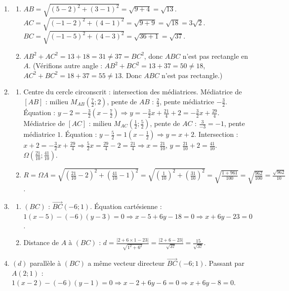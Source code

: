 \begin{enumerate}[label=\arabic*)]
    \item 
    \begin{enumerate}[label=\alph*)]
        \item $AB = \sqrt{(5-2)^2 + (3-1)^2} = \sqrt{9 + 4} = \sqrt{13}$.
        $AC = \sqrt{(-1-2)^2 + (4-1)^2} = \sqrt{9 + 9} = \sqrt{18} = 3\sqrt{2}$.
        $BC = \sqrt{(-1-5)^2 + (4-3)^2} = \sqrt{36 + 1} = \sqrt{37}$.
        \item $AB^2 + AC^2 = 13 + 18 = 31 \neq 37 = BC^2$, donc $ABC$ n'est pas rectangle en $A$. (Vérifions autre angle : $AB^2 + BC^2 = 13 + 37 = 50 \neq 18$, $AC^2 + BC^2 = 18 + 37 = 55 \neq 13$. Donc $ABC$ n'est pas rectangle.)
    \end{enumerate}
    \item 
    \begin{enumerate}[label=\alph*)]
        \item Centre du cercle circonscrit : intersection des médiatrices. Médiatrice de $[AB]$ : milieu $M_{AB}\left(\frac{7}{2}; 2\right)$, pente de $AB$ : $\frac{2}{3}$, pente médiatrice $-\frac{3}{2}$. Équation : $y - 2 = -\frac{3}{2}\left(x - \frac{7}{2}\right) \Rightarrow y = -\frac{3}{2}x + \frac{21}{4} + 2 = -\frac{3}{2}x + \frac{29}{4}$.
        Médiatrice de $[AC]$ : milieu $M_{AC}\left(\frac{1}{2}; \frac{5}{2}\right)$, pente de $AC$ : $\frac{3}{-3} = -1$, pente médiatrice $1$. Équation : $y - \frac{5}{2} = 1\left(x - \frac{1}{2}\right) \Rightarrow y = x + 2$.
        Intersection : $x + 2 = -\frac{3}{2}x + \frac{29}{4} \Rightarrow \frac{5}{2}x = \frac{29}{4} - 2 = \frac{21}{4} \Rightarrow x = \frac{21}{10}$, $y = \frac{21}{10} + 2 = \frac{41}{10}$. $\Omega\left(\frac{21}{10}; \frac{41}{10}\right)$.
        \item $R = \Omega A = \sqrt{\left(\frac{21}{10} - 2\right)^2 + \left(\frac{41}{10} - 1\right)^2} = \sqrt{\left(\frac{1}{10}\right)^2 + \left(\frac{31}{10}\right)^2} = \sqrt{\frac{1 + 961}{100}} = \sqrt{\frac{962}{100}} = \frac{\sqrt{962}}{10}$.
    \end{enumerate}
    \item 
    \begin{enumerate}[label=\alph*)]
        \item $(BC)$ : $\overrightarrow{BC}(-6; 1)$. Équation cartésienne : $1(x - 5) - (-6)(y - 3) = 0 \Rightarrow x - 5 + 6y - 18 = 0 \Rightarrow x + 6y - 23 = 0$.
        \item Distance de $A$ à $(BC)$ : $d = \frac{|2 + 6\times1 - 23|}{\sqrt{1^2 + 6^2}} = \frac{|2 + 6 - 23|}{\sqrt{37}} = \frac{15}{\sqrt{37}}$.
    \end{enumerate}
    \item $(d)$ parallèle à $(BC)$ a même vecteur directeur $\overrightarrow{BC}(-6; 1)$. Passant par $A(2; 1)$ : $1(x - 2) - (-6)(y - 1) = 0 \Rightarrow x - 2 + 6y - 6 = 0 \Rightarrow x + 6y - 8 = 0$.
\end{enumerate}

